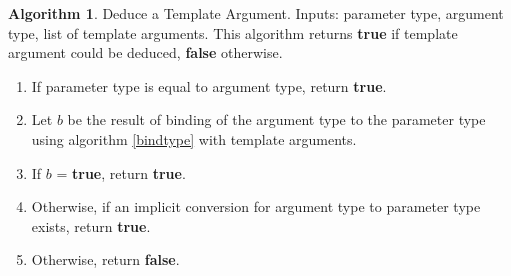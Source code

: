 \documentclass[a4paper,oneside,11pt]{book}
\theoremstyle{definition}
\newtheorem{algo}{Algorithm}[section]
\begin{document}
\begin{algo}\label{deducetemplatearg} Deduce a Template Argument. Inputs: parameter type, argument type, list of template arguments.
This algorithm returns \textbf{true} if template argument could be deduced, \textbf{false} otherwise.
\begin{enumerate}
\item
If parameter type is equal to argument type, return \textbf{true}.
\item
Let $b$ be the result of binding of the argument type to the parameter type using algorithm \ref{bindtype} with template arguments.
\item
If $b$ = \textbf{true}, return \textbf{true}.
\item
Otherwise, if an implicit conversion for argument type to parameter type exists, return \textbf{true}.
\item
Otherwise, return \textbf{false}.
\end{enumerate}
\end{algo}
\end{document}
